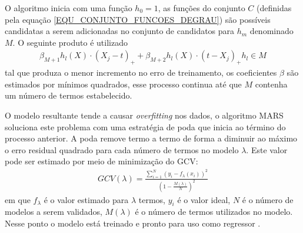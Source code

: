O algoritmo inicia com uma função \(h_{0} = 1\), as funções do conjunto \(C\) (definidas pela equação \eqref{EQU_CONJUNTO_FUNCOES_DEGRAU}) são possíveis candidatas a serem adicionadas no conjunto de candidatos para \(h_{m}\) denominado \(M\). O seguinte produto é utilizado
\begin{align}
\beta_{M+1}h_{l}(X) \cdot (X_{j}-t)_{+} + \beta_{M+2}h_{l}(X) \cdot (t-X_{j})_{+} h_{l} \in M
\end{align}
tal que produza o menor incremento no erro de treinamento, os coeficientes \(\beta\) são estimados por mínimos quadrados, esse processo continua até que \(M\) contenha um número de termos estabelecido. 

O modelo resultante tende a causar \emph{overfitting} nos dados, o algoritmo MARS soluciona este problema com uma estratégia de poda que inicia ao término  do processo anterior. A poda remove termo a termo de forma a diminuir ao máximo o erro residual quadrado para cada número de termos no modelo \(\lambda\). Este valor pode ser estimado por meio de minimização do GCV:
\begin{align}
GCV(\lambda) = \frac{\sum\limits_{i=1}^{N}(y_{i} - f_{\lambda}(x_{i}))^{2}}{(1-\frac{M(\lambda)}{N})^{2}}
\end{align}
em que \(f_{\lambda}\) é o valor estimado para \(\lambda\) termos, \(y_{i}\) é o valor ideal, \(N\) é o número de modelos a serem validados, \(M(\lambda)\) é o número de termos utilizados no modelo. Nesse ponto o modelo está treinado e pronto para uso como regressor \cite{StatisticalLearning2001}.

